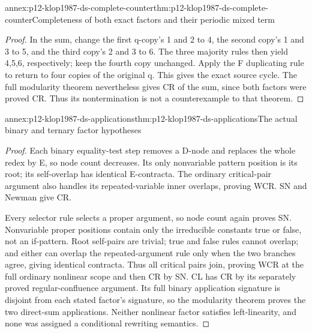 \begin{annexitem}{annex:p12-klop1987-ds-complete-counter}{thm:p12-klop1987-ds-complete-counter}{Completeness of both exact factors and their periodic mixed term}
\begin{proof}
In the sum, change the first q-copy's 1 and 2 to 4, the second
copy's 1 and 3 to 5, and the third copy's 2 and 3 to 6. The three
majority rules then yield 4,5,6, respectively; keep the fourth
copy unchanged. Apply the F duplicating rule to return to four
copies of the original q. This gives the exact source cycle.
The full modularity theorem nevertheless gives CR of the sum,
since both factors were proved CR. Thus its nontermination is
not a counterexample to that theorem.
\end{proof}
\end{annexitem}

\begin{annexitem}{annex:p12-klop1987-ds-applications}{thm:p12-klop1987-ds-applications}{The actual binary and ternary factor hypotheses}
\begin{proof}
Each binary equality-test step removes a D-node and replaces
the whole redex by E, so node count decreases. Its only
nonvariable pattern position is its root; its self-overlap
has identical E-contracta. The ordinary critical-pair argument
also handles its repeated-variable inner overlaps, proving WCR.
SN and Newman give CR.

Every selector rule selects a proper argument, so node count
again proves SN. Nonvariable proper positions contain only
the irreducible constants true or false, not an if-pattern.
Root self-pairs are trivial; true and false rules cannot
overlap; and either can overlap the repeated-argument rule
only when the two branches agree, giving identical contracta.
Thus all critical pairs join, proving WCR at the full ordinary
nonlinear scope and then CR by SN. CL has CR by its separately
proved regular-confluence argument. Its full binary application
signature is disjoint from each stated factor's signature,
so the modularity theorem proves the two direct-sum applications.
Neither nonlinear factor satisfies left-linearity, and none
was assigned a conditional rewriting semantics.
\end{proof}
\end{annexitem}
